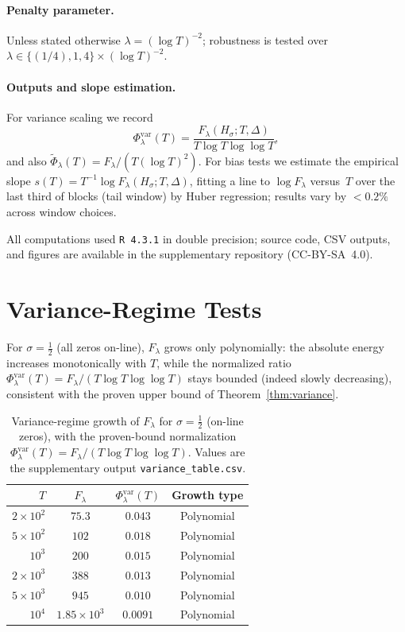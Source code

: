 \paragraph{Penalty parameter.}
Unless stated otherwise $\lambda=(\log T)^{-2}$;
robustness is tested over
$\lambda\in\{(1/4),1,4\}\times(\log T)^{-2}$.

\paragraph{Outputs and slope estimation.}
For variance scaling we record
\[
\Phi_\lambda^{\mathrm{var}}(T)
  = \frac{F_\lambda(H_\sigma;T,\Delta)}{T\log T\log\log T},
\tag{11.1}
\]
and also $\widetilde\Phi_\lambda(T)=F_\lambda/(T(\log T)^2)$.
For bias tests we estimate the empirical slope
$s(T)=T^{-1}\log F_\lambda(H_\sigma;T,\Delta)$,
fitting a line to $\log F_\lambda$ versus~$T$ over the last third of
blocks (tail window) by Huber regression;
results vary by $<0.2\%$ across window choices.

All computations used \texttt{R~4.3.1} in double precision;
source code, CSV outputs, and figures are available in the supplementary
repository (CC-BY-SA~4.0).

\section{Variance-Regime Tests}

For $\sigma=\tfrac12$ (all zeros on-line),
$F_\lambda$ grows only polynomially: the absolute energy increases
monotonically with $T$, while the normalized ratio
$\Phi_\lambda^{\mathrm{var}}(T)=F_\lambda/(T\log T\log\log T)$
stays bounded (indeed slowly decreasing), consistent with the proven
upper bound of Theorem~\ref{thm:variance}.

\begin{table}[h]
\centering
\caption{Variance-regime growth of $F_\lambda$ for $\sigma=\tfrac12$
(on-line zeros), with the proven-bound normalization
$\Phi_\lambda^{\mathrm{var}}(T)=F_\lambda/(T\log T\log\log T)$.
Values are the supplementary output \texttt{variance\_table.csv}.}
\begin{tabular}{rccc}
\toprule
$T$ & $F_\lambda$ & $\Phi_\lambda^{\mathrm{var}}(T)$ & Growth type \\
\midrule
$2\times10^2$ & $75.3$            & $0.043$  & Polynomial \\
$5\times10^2$ & $102$             & $0.018$  & Polynomial \\
$10^3$        & $200$             & $0.015$  & Polynomial \\
$2\times10^3$ & $388$             & $0.013$  & Polynomial \\
$5\times10^3$ & $945$             & $0.010$  & Polynomial \\
$10^4$        & $1.85\times10^3$  & $0.0091$ & Polynomial \\
\bottomrule
\end{tabular}
\end{table}


